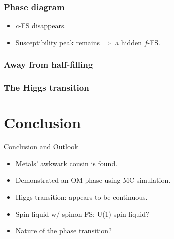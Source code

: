 \documentclass[xcolor=table, 10pt, aspectratio=43]{beamer}
\begin{document}
\begin{frame}
\frametitle{Phase diagram}
\begin{itemize}
\item $c$-FS disappears.
\item Susceptibility peak remains $\Rightarrow$ a hidden $f$-FS.
\end{itemize}
\end{frame}

\begin{frame}
\frametitle{Away from half-filling}
\end{frame}

\begin{frame}
\frametitle{The Higgs transition}
\end{frame}

\section{Conclusion}
\begin{frame}{Conclusion and Outlook}
\begin{itemize}
\item Metals' awkwark cousin is found.
\item Demonstrated an OM phase using MC simulation.
\item Higgs transition: appears to be continuous.
\item Spin liquid w/ spinon FS: U(1) spin liquid?
\item Nature of the phase transition?
\end{itemize}
\end{frame}
\end{document}
